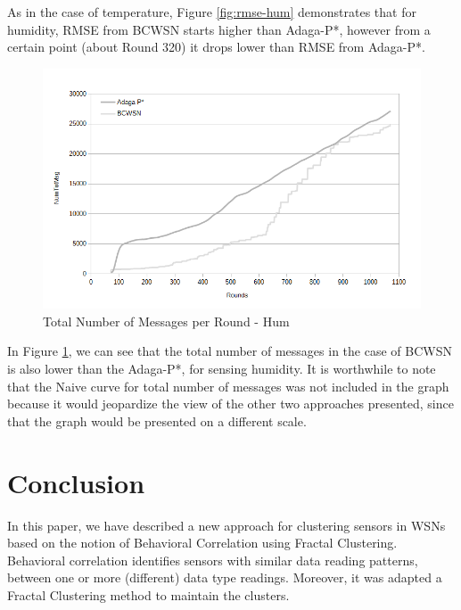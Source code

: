 \documentclass{acm_proc_article-sp}
\begin{document}
As in the case of temperature, Figure \ref{fig:rmse-hum} demonstrates that for 
humidity, RMSE from BCWSN starts higher than Adaga-P*, however from a certain 
point (about Round 320) it drops lower than RMSE from Adaga-P*.

\begin{figure}[!htb]
\begin{center}
	\includegraphics[scale=0.33]{BCWSN-TotNumMsgxRound-PB-2Appr-Hum.png}
    \caption{Total Number of Messages per Round - Hum}
    \label{fig:tot-num-msg-hum}
\end{center}
\end{figure}
\vspace*{-.3cm}

In Figure \ref{fig:tot-num-msg-hum}, we can see that the total number of messages 
in the case of BCWSN is also lower than the Adaga-P*, for sensing humidity. It is 
worthwhile to note that the Naive curve for total number of messages was not included 
in the graph because it would jeopardize the view of the other two approaches 
presented, since that the graph would be presented on a different scale.

\section{Conclusion}
\label{conclusion}

In this paper, we have described a new approach for clustering sensors in WSNs
based on the notion of Behavioral Correlation using Fractal Clustering.
Behavioral correlation identifies sensors with similar data reading patterns,
between one or more (different) data type readings. Moreover, it was adapted a
Fractal Clustering method to maintain the clusters.
\vspace*{-.3cm}
\end{document}
